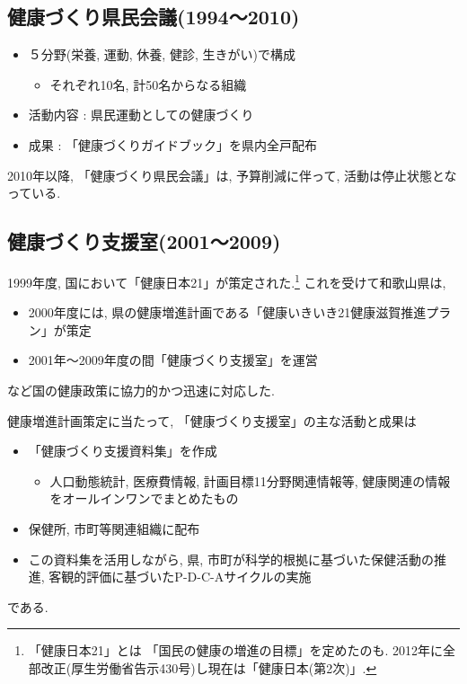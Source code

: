 \subsection{健康づくり県民会議(1994〜2010)}
\begin{itemize} \setlength{\itemsep}{-0.5mm} \setlength{\parskip}{-0.5mm}
	\item ５分野(栄養, 運動, 休養, 健診, 生きがい)で構成
	      \begin{itemize} \setlength{\itemsep}{-0.5mm} \setlength{\parskip}{-0.5mm}
		      \item それぞれ10名, 計50名からなる組織
	      \end{itemize}
	\item 活動内容 : 県民運動としての健康づくり
	\item 成果 : 「健康づくりガイドブック」を県内全戸配布
\end{itemize}
2010年以降, 「健康づくり県民会議」は, 予算削減に伴って, 活動は停止状態となっている.

\subsection{健康づくり支援室(2001〜2009)}
1999年度, 国において「健康日本21」が策定された.\footnote{「健康日本21」とは
	「国民の健康の増進の目標」を定めたのも. 2012年に全部改正(厚生労働省告示430号)し現在は「健康日本(第2次)」.}
これを受けて和歌山県は,
\begin{itemize} \setlength{\itemsep}{-0.5mm} \setlength{\parskip}{-0.5mm}
	\item 2000年度には, 県の健康増進計画である「健康いきいき21健康滋賀推進プラン」が策定
	\item 2001年〜2009年度の間「健康づくり支援室」を運営
\end{itemize}
など国の健康政策に協力的かつ迅速に対応した.

健康増進計画策定に当たって, 「健康づくり支援室」の主な活動と成果は
\begin{itemize} \setlength{\itemsep}{-0.5mm} \setlength{\parskip}{-0.5mm}
	\item 「健康づくり支援資料集」を作成
	      \begin{itemize} \setlength{\itemsep}{-0.5mm} \setlength{\parskip}{-0.5mm}
		      \item 人口動態統計, 医療費情報, 計画目標11分野関連情報等, 健康関連の情報をオールインワンでまとめたもの
	      \end{itemize}
	\item 保健所, 市町等関連組織に配布
	\item この資料集を活用しながら, 県, 市町が科学的根拠に基づいた保健活動の推進, 客観的評価に基づいたP-D-C-Aサイクルの実施
\end{itemize}
である.


